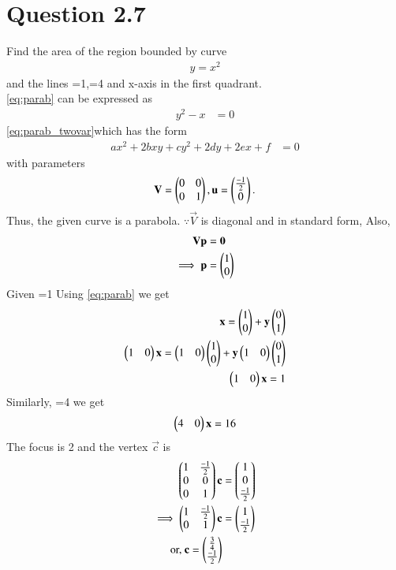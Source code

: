 \documentclass[journal,12pt,twocolumn]{IEEEtran}
\begin{document}
\section{Question 2.7}
Find the area of the region bounded by curve 
\begin{align}
y = x^2
\label{eq:parab}
\end{align}
and the lines =1,=4 and x-axis in the first quadrant.
\\
\solution \eqref{eq:parab} can be expressed as
\begin{align}
 y^2  -x &= 0
\label{eq:parab_twovar}
\end{align}
\eqref{eq:parab_twovar}which has the form 
\begin{align}\label{eq:conic_quad form}
ax^2+2bxy+cy^2+2dy+2ex+f &= 0
\end{align}with parameters
\begin{align}
\mathbf{V} = \begin{pmatrix}0 & 0\\0 & 1\end{pmatrix}, \mathbf{u} = \begin{pmatrix}\frac{-1}{2}\\0\end{pmatrix}.
\label{eq:parab_twovar_params}
\end{align}
Thus, the given curve is a parabola.  $\because \vec{V}$ is diagonal and in standard form,
Also, 
\begin{align}
\mathbf{V}\mathbf{p} &= \mathbf{0}
\\
\implies \mathbf{p} &= \begin{pmatrix}1\\0\end{pmatrix}
\label{eq:parab_twovar_p}
\end{align}
Given =1  Using \eqref{eq:parab} we get
\begin{align}
\mathbf{x}=\begin{pmatrix}1\\0\end{pmatrix}+\mathbf{y}\begin{pmatrix}0\\1\end{pmatrix}\\
\begin{pmatrix}1 & 0\end{pmatrix}\mathbf{x}=\begin{pmatrix}1 & 0\end{pmatrix}\begin{pmatrix}1\\0\end{pmatrix}+\mathbf{y}\begin{pmatrix}1 & 0\end{pmatrix}\begin{pmatrix}0\\1\end{pmatrix}\\
\begin{pmatrix}1 & 0\end{pmatrix}\mathbf{x}=1
\end{align}
Similarly, =4 we get
\begin{align}
\begin{pmatrix}4 & 0\end{pmatrix}\mathbf{x}=16
\end{align}
The focus is 2 and the vertex $\vec{c}$ is
\begin{align}
\begin{pmatrix} 1 & \frac{-1}{2} \\ 0 & 0 \\ 0 & 1\end{pmatrix}\mathbf{c} &= \begin{pmatrix}1 \\ 0\\\frac{-1}{2}\end{pmatrix} 
\\
\implies 
\begin{pmatrix} 1 & \frac{-1}{2} \\  0 & 1\end{pmatrix}\mathbf{c} &= \begin{pmatrix}1 \\ \frac{-1}{2}\end{pmatrix} 
\\
\text{or, } \mathbf{c} = \begin{pmatrix}\frac{3}{4}\\\frac{-1}{2}\end{pmatrix}
\end{align}
\end{document}

